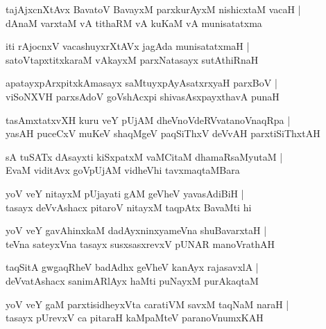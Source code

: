 \documentclass[twoside,12pt,openright]{book}
\newcounter{shloka}[chapter]
\begin{document}
\begin{shloka}%
tajAjxcnXtAvx BavatoV BavayxM parxkurAyxM nishicxtaM vacaH |\\
dAnaM varxtaM vA tithaRM vA kuKaM vA munisatatxma
\end{shloka}

\begin{shloka}%
iti rAjocnxV vacashuyxrXtAVx jagAda munisatatxmaH |\\
satoVtapxtitxkaraM vAkayxM parxNatasayx sutAthiRnaH
\end{shloka}

\begin{shloka}%
apatayxpArxpitxkAmasayx saMtuyxpAyAsatxrxyaH parxBoV |\\
viSoNXVH parxsAdoV goVshAcxpi shivasAsxpayxthavA punaH 
\end{shloka}

\begin{shloka}%
tasAmxtatxvXH kuru veY pUjAM dheVnoVdeRVvatanoVnaqRpa |\\
yasAH puceCxV muKeV shaqMgeV paqSiThxV deVvAH parxtiSiThxtAH 
\end{shloka}

\begin{shloka}%
sA tuSATx dAsayxti kiSxpatxM vaMCitaM dhamaRsaMyutaM |\\
EvaM viditAvx goVpUjAM vidheVhi tavxmaqtaMBara
\end{shloka}

\begin{shloka}%
yoV veY nitayxM pUjayati gAM geVheV yavasAdiBiH |\\
tasayx deVvAshacx pitaroV nitayxM taqpAtx BavaMti hi
\end{shloka}

\begin{shloka}%
yoV veY gavAhinxkaM dadAyxninxyameVna shuBavarxtaH |\\
teVna sateyxVna tasayx susxsasxrevxV pUNAR manoVrathAH
\end{shloka}

\begin{shloka}%
taqSitA gwgaqRheV badAdhx geVheV kanAyx rajasavxlA |\\
deVvatAshacx sanimARlAyx haMti puNayxM purAkaqtaM 
\end{shloka}

\begin{shloka}%
yoV veY gaM parxtisidheyxVta caratiVM savxM taqNaM naraH |\\
tasayx pUrevxV ca pitaraH kaMpaMteV paranoVnumxKAH
\end{shloka}
\end{document}

